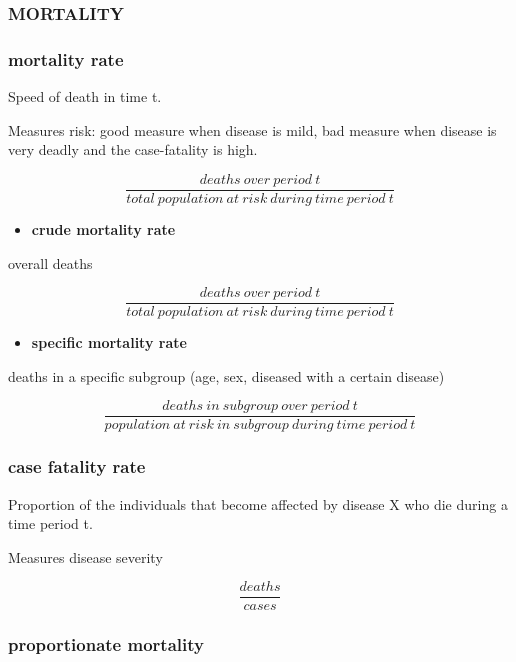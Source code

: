 \documentclass[
]{article}
\providecommand{\tightlist}{%
  \setlength{\itemsep}{0pt}\setlength{\parskip}{0pt}}
\begin{document}
\hypertarget{mortality}{%
\subsubsection{MORTALITY}\label{mortality}}

\hypertarget{mortality-rate}{%
\subsubsection{mortality rate}\label{mortality-rate}}

Speed of death in time t.

Measures risk: good measure when disease is mild, bad measure when
disease is very deadly and the case-fatality is high.

\[\frac{deaths\:over\:period\:t}{total\:population\:at\:risk\:during\:time\:period\:t}\]

\begin{itemize}
\tightlist
\item
  \textbf{crude mortality rate}
\end{itemize}

overall deaths

\[\frac{deaths\:over\:period\:t}{total\:population\:at\:risk\:during\:time\:period\:t}\]

\begin{itemize}
\tightlist
\item
  \textbf{specific mortality rate}
\end{itemize}

deaths in a specific subgroup (age, sex, diseased with a certain
disease)

\[\frac{deaths\:in\:subgroup\:over\:period\:t}{population\:at\:risk\:in\:subgroup\:during\:time\:period\:t}\]

\hypertarget{case-fatality-rate}{%
\subsubsection{case fatality rate}\label{case-fatality-rate}}

Proportion of the individuals that become affected by disease X who die
during a time period t.

Measures disease severity

\[\frac{deaths}{cases}\]

\hypertarget{proportionate-mortality}{%
\subsubsection{proportionate mortality}\label{proportionate-mortality}}
\end{document}
